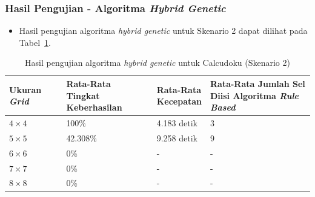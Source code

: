 \documentclass{beamer}
\begin{document}
\begin{frame}
\frametitle{Hasil Pengujian - Algoritma \textit{Hybrid Genetic}}
\begin{itemize}
\item Hasil pengujian algoritma \textit{hybrid genetic} untuk Skenario 2 dapat dilihat pada Tabel~\ref{tab:pengujianhg2}.
\end{itemize}
\begin{table}
\tiny
\centering
\captionsetup{justification=centering}
\caption[Hasil pengujian algoritma \textit{hybrid genetic} untuk Calcudoku (Skenario 2)]{Hasil pengujian algoritma \textit{hybrid genetic} untuk Calcudoku (Skenario 2)}
\begin{tabular}{| l | l | l | l |}
\hline
Ukuran \textit{Grid} & \makecell[c]{Rata-Rata \\ Tingkat Keberhasilan} & \makecell[c]{Rata-Rata \\ Kecepatan} & \makecell[c]{Rata-Rata Jumlah Sel \\ Diisi Algoritma \textit{Rule Based}} \\
\hline \hline
\begin{math}4 \times 4\end{math} & 100\% & 4.183 detik & 3 \\
\hline
\begin{math}5 \times 5\end{math} & 42.308\% & 9.258 detik & 9 \\
\hline
\begin{math}6 \times 6\end{math} & 0\% & - & - \\
\hline
\begin{math}7 \times 7\end{math} & 0\% & - & - \\
\hline
\begin{math}8 \times 8\end{math} & 0\% & - & - \\
\hline
\end{tabular}
\label{tab:pengujianhg2}
\end{table}
\end{frame}

\end{document}
